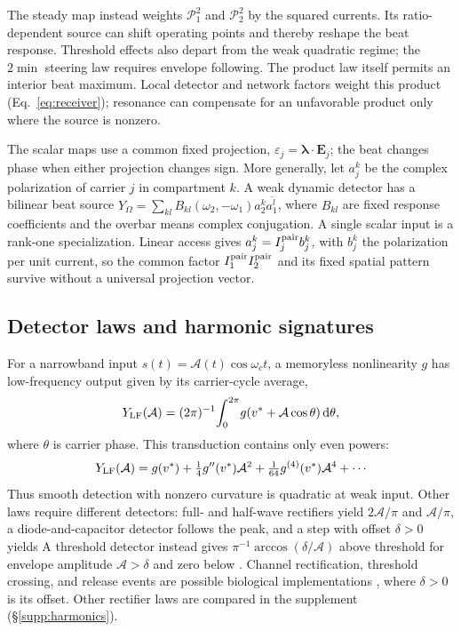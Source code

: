 \documentclass[11pt,a4paper]{article}
\providecommand{\DIFaddtex}[1]{{\protect\color{blue} \sf #1}} %
\providecommand{\DIFdeltex}[1]{{\protect\color{red} \scriptsize #1}} %
\providecommand{\DIFaddbegin}{} %
\providecommand{\DIFaddend}{} %
\providecommand{\DIFdelbegin}{} %
\providecommand{\DIFdelend}{} %
\providecommand{\DIFadd}[1]{\texorpdfstring{\DIFaddtex{#1}}{#1}} %
\providecommand{\DIFdel}[1]{\texorpdfstring{\DIFdeltex{#1}}{}} %
\begin{document}
The steady map instead weights $\mathcal P_1^2$ and $\mathcal P_2^2$ by
the squared currents. Its ratio-dependent source can shift operating points
and thereby reshape the beat response. Threshold effects also depart from
the weak quadratic regime; the $2\min$ steering law requires envelope
following. The product law itself permits an interior beat maximum.
Local detector and network factors weight this product
(Eq.~\eqref{eq:receiver}); resonance can compensate for an unfavorable
product only where the source is nonzero.

The scalar maps use a common fixed projection,
$\varepsilon_j=\boldsymbol\lambda\cdot\mathbf E_j$; the beat changes phase
when either projection changes sign. More generally, let $a_j^k$ be the
complex polarization of carrier $j$ in compartment $k$. A weak dynamic
detector has a bilinear beat source
$Y_\Omega=\sum_{kl}B_{kl}(\omega_2,-\omega_1)a_2^k\overline{a_1^l}$,
where $B_{kl}$ are fixed response coefficients and the overbar means complex
conjugation. A single scalar input is a rank-one specialization. Linear
access gives $a_j^k=I_j^{\rm pair}b_j^k$, with $b_j^k$ the polarization per
unit current, so the common factor $I_1^{\rm pair}I_2^{\rm pair}$ and its
fixed spatial pattern survive without a universal projection vector.

\subsection{Detector laws and harmonic signatures}\label{sec:transduction}
For a narrowband input $s(t)=\mathcal A(t)\cos\omega_c t$, a memoryless
nonlinearity $g$ has low-frequency output given by its carrier-cycle average,
\[
Y_{\rm LF}(\mathcal A)=(2\pi)^{-1}\!\int_0^{2\pi}\!g(v^*+\mathcal A\cos\theta)\,\mathrm{d}\theta,
\]
where $\theta$ is carrier phase. This transduction contains
only even powers:
\begin{equation}
Y_{\rm LF}(\mathcal A)=g(v^*)+\tfrac14 g''(v^*)\mathcal A^2+\tfrac1{64}g^{(4)}(v^*)\mathcal A^4+\cdots
\label{eq:cycavg}
\end{equation}
Thus smooth detection with nonzero curvature is quadratic at weak input.
\DIFdelbegin \DIFdel{Other laws require different detectors: full- and half-wave rectifiers yield
$2\mathcal A/\pi$ and $\mathcal A/\pi$, a diode-and-capacitor detector follows the peak, and a step with offset $\delta>0$ yields
}\DIFdelend \DIFaddbegin \DIFadd{A threshold detector instead gives
}\DIFaddend $\pi^{-1}\arccos(\delta/\mathcal A)$ \DIFdelbegin \DIFdel{above threshold }\DIFdelend \DIFaddbegin \DIFadd{for envelope amplitude
$\mathcal A>\delta$ }\DIFaddend and zero below\DIFdelbegin \DIFdel{.
Channel rectification, threshold crossing, and release events are possible
biological implementations}\DIFdelend \DIFaddbegin \DIFadd{, where $\delta>0$ is its offset.
Other rectifier laws are compared in the supplement (\S\ref{supp:harmonics})}\DIFaddend .
\end{document}
